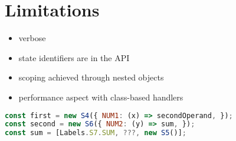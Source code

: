 \section{Limitations}
\label{section:nodelimitations}

\begin{itemize}
\item verbose
\item state identifiers are in the API
\item scoping achieved through nested objects
\item performance aspect with class-based handlers
\end{itemize}

\begin{lstlisting}[language=javascript]
const first = new S4({ NUM1: (x) => secondOperand, });
const second = new S6({ NUM2: (y) => sum, });
const sum = [Labels.S7.SUM, ???, new S5()];
\end{lstlisting}